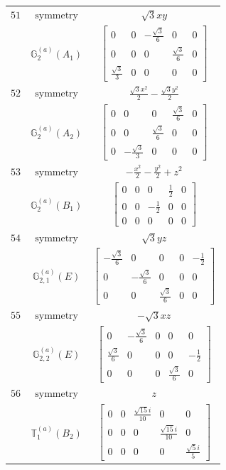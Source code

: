 \documentclass[fleqn,8pt,landscape]{jsarticle}
\begin{document}
\begin{longtable}{ccc}
$ 51 $ & $ \text{symmetry} $ & $ \sqrt{3} x y $ \\
$  $ & $ \mathbb{G}_{2}^{(a)}(A_{1}) $ & $ \begin{bmatrix} 0 & 0 & - \frac{\sqrt{3}}{6} & 0 & 0 \\ 0 & 0 & 0 & \frac{\sqrt{3}}{6} & 0 \\ \frac{\sqrt{3}}{3} & 0 & 0 & 0 & 0 \end{bmatrix} $ \\ \hline
$ 52 $ & $ \text{symmetry} $ & $ \frac{\sqrt{3} x^{2}}{2} - \frac{\sqrt{3} y^{2}}{2} $ \\
$  $ & $ \mathbb{G}_{2}^{(a)}(A_{2}) $ & $ \begin{bmatrix} 0 & 0 & 0 & \frac{\sqrt{3}}{6} & 0 \\ 0 & 0 & \frac{\sqrt{3}}{6} & 0 & 0 \\ 0 & - \frac{\sqrt{3}}{3} & 0 & 0 & 0 \end{bmatrix} $ \\ \hline
$ 53 $ & $ \text{symmetry} $ & $ - \frac{x^{2}}{2} - \frac{y^{2}}{2} + z^{2} $ \\
$  $ & $ \mathbb{G}_{2}^{(a)}(B_{1}) $ & $ \begin{bmatrix} 0 & 0 & 0 & \frac{1}{2} & 0 \\ 0 & 0 & - \frac{1}{2} & 0 & 0 \\ 0 & 0 & 0 & 0 & 0 \end{bmatrix} $ \\ \hline
$ 54 $ & $ \text{symmetry} $ & $ \sqrt{3} y z $ \\
$  $ & $ \mathbb{G}_{2,1}^{(a)}(E) $ & $ \begin{bmatrix} - \frac{\sqrt{3}}{6} & 0 & 0 & 0 & - \frac{1}{2} \\ 0 & - \frac{\sqrt{3}}{6} & 0 & 0 & 0 \\ 0 & 0 & \frac{\sqrt{3}}{6} & 0 & 0 \end{bmatrix} $ \\ \hline
$ 55 $ & $ \text{symmetry} $ & $ - \sqrt{3} x z $ \\
$  $ & $ \mathbb{G}_{2,2}^{(a)}(E) $ & $ \begin{bmatrix} 0 & - \frac{\sqrt{3}}{6} & 0 & 0 & 0 \\ \frac{\sqrt{3}}{6} & 0 & 0 & 0 & - \frac{1}{2} \\ 0 & 0 & 0 & \frac{\sqrt{3}}{6} & 0 \end{bmatrix} $ \\ \hline
$ 56 $ & $ \text{symmetry} $ & $ z $ \\
$  $ & $ \mathbb{T}_{1}^{(a)}(B_{2}) $ & $ \begin{bmatrix} 0 & 0 & \frac{\sqrt{15} i}{10} & 0 & 0 \\ 0 & 0 & 0 & \frac{\sqrt{15} i}{10} & 0 \\ 0 & 0 & 0 & 0 & \frac{\sqrt{5} i}{5} \end{bmatrix} $ \\ \hline

\end{longtable}
\end{document}
